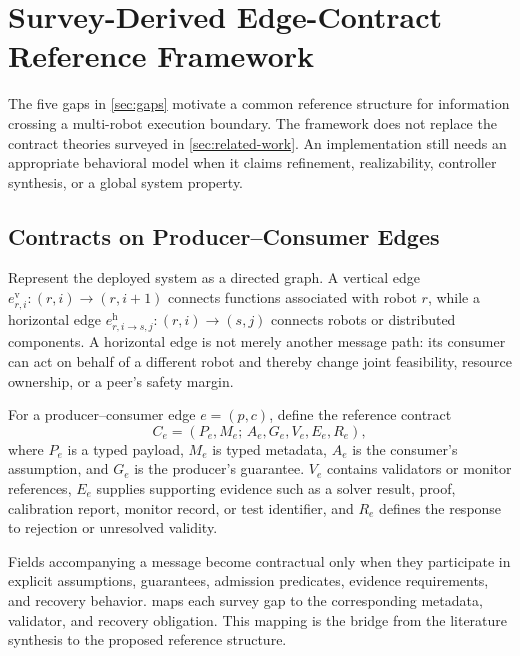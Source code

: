 \section{Survey-Derived Edge-Contract Reference Framework}
\label{sec:synthesis}

The five gaps in \cref{sec:gaps} motivate a common reference structure for
information crossing a multi-robot execution boundary.  The framework does not
replace the contract theories surveyed in \cref{sec:related-work}.  An
implementation still needs an appropriate behavioral model when it claims
refinement, realizability, controller synthesis, or a global system property.

\subsection{Contracts on Producer--Consumer Edges}

Represent the deployed system as a directed graph.  A vertical edge
$e^{\mathrm v}_{r,i}:(r,i)\rightarrow(r,i+1)$ connects functions associated with
robot $r$, while a horizontal edge
$e^{\mathrm h}_{r,i\rightarrow s,j}:(r,i)\rightarrow(s,j)$ connects robots or
distributed components.  A horizontal edge is not merely another message path:
its consumer can act on behalf of a different robot and thereby change joint
feasibility, resource ownership, or a peer's safety margin.

For a producer--consumer edge $e=(p,c)$, define the reference contract
\begin{equation}
  C_e=(P_e,M_e;\,A_e,G_e,V_e,E_e,R_e),
  \label{eq:contract}
\end{equation}
where $P_e$ is a typed payload, $M_e$ is typed metadata, $A_e$ is the
consumer's assumption, and $G_e$ is the producer's guarantee.  $V_e$ contains
validators or monitor references, $E_e$ supplies supporting evidence such as a
solver result, proof, calibration report, monitor record, or test identifier,
and $R_e$ defines the response to rejection or unresolved validity.

Fields accompanying a message become contractual only when they participate in
explicit assumptions, guarantees, admission predicates, evidence requirements,
and recovery behavior.
 maps each survey gap to the corresponding
metadata, validator, and recovery obligation.  This mapping is the bridge from
the literature synthesis to the proposed reference structure.



